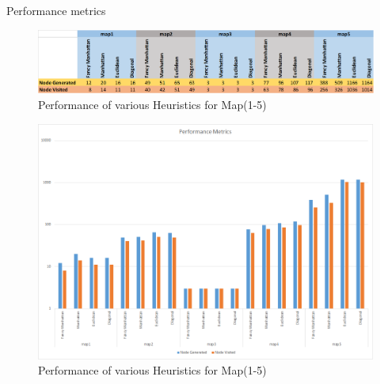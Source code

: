 \documentclass[12pt]{article}
\begin{document}
\begin{section}{Performance metrics}

\begin{figure}[H]
\label{map1}
\begin{center}
\includegraphics[width=7.0in]{table.png}
\caption{Performance of various Heuristics for Map(1-5)  }
\end{center}
\end{figure}


\begin{figure}[H]
\label{map1}
\begin{center}
\includegraphics[width=7.0in]{graphImage.png}
\caption{Performance of various Heuristics for Map(1-5)  }
\end{center}
\end{figure}



\end{section}
 
\end{document}

